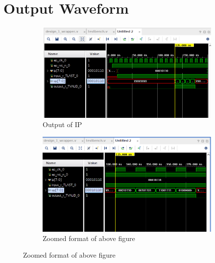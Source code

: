 \documentclass{article}
\begin{document}
\section{Output Waveform}
\vspace{1cm}
\begin{figure}[h]
\centering
\begin{subfigure}[b]{0.8\textwidth}
    \centering
\includegraphics[width=\textwidth]{figs/p1wavfull.png}
    \caption{Output of IP}
    \label{fig:my_label}
\end{subfigure}
\hfill
\begin{subfigure}[b]{0.8\textwidth}
    \centering
\includegraphics[width=\textwidth]{figs/p1wav.png}
    \caption{Zoomed format of above figure}
    \label{fig:my_label}
\end{subfigure}
\end{figure}
\end{document}
